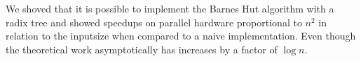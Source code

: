 We shoved that it is possible to implement the Barnes Hut algorithm with a radix
tree and showed speedups on parallel hardware proportional to $n^2$ in relation
to the inputsize when compared to a naive implementation. Even though the
theoretical work asymptotically has increases by a factor of $\log n$.
